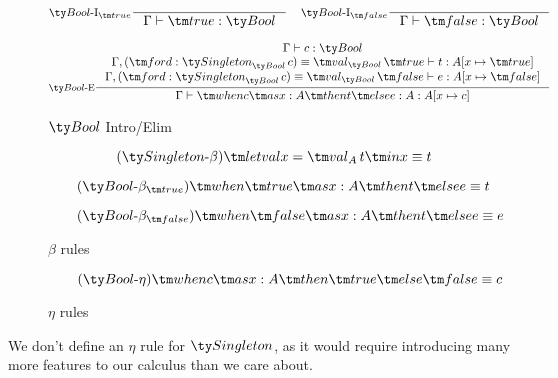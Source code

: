 \begin{figure*}[h]
  \[
  \inference[\Intro{$\Bool$}$_{\true}$]{}
            {\Gamma \vdash \true : \Bool}
  \quad
  \inference[\Intro{$\Bool$}$_{\false}$]{}
            {\Gamma \vdash \false : \Bool}
  \]

  \[
  \inference[\Elim{$\Bool$}]
            {\Gamma \vdash c : \Bool
            \\ \Gamma, (\ford : \Singleton[\Bool][c]) \equiv \val[\Bool][\true] \vdash t : A[x \mapsto \true]
            \\ \Gamma, (\ford : \Singleton[\Bool][c]) \equiv \val[\Bool][\false] \vdash e : A[x \mapsto \false]
            }
            {\Gamma \vdash \when c x A t e : A : A[x \mapsto c]}
  \]

  \caption*{$\Bool$ Intro/Elim}
  \label{fig:dt-singletons-bool-intro-elim}
\end{figure*}



\begin{figure*}[h]
  \begin{equation}
    \tag{$\Singleton$-$\beta$}
    \letval x {\val[A][t]} x \equiv t
  \end{equation}

  \begin{equation}
    \tag{$\Bool$-$\beta_{\true}$}
    \when \true x A t e \equiv t
  \end{equation}

  \begin{equation}
    \tag{$\Bool$-$\beta_{\false}$}
    \when \false x A t e \equiv e
  \end{equation}

  \caption*{$\beta$ rules}
  \label{fig:dt-singletons-beta}
\end{figure*}

\begin{figure*}[h]
  \begin{equation}
    \tag{$\Bool$-$\eta$}
    \when c x A \true \false \equiv c
  \end{equation}

  \caption*{$\eta$ rules}
  \label{fig:dt-singletons-eta}
\end{figure*}

We don't define an $\eta$ rule for $\Singleton$, as it would require introducing many more features to our calculus than we care about.
